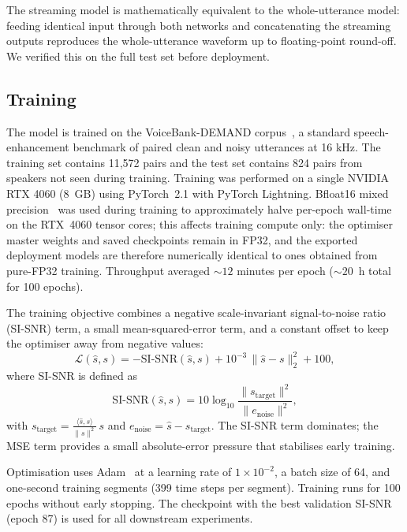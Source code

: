\documentclass[conference]{IEEEtran}
\begin{document}
The streaming model is mathematically equivalent to the whole-utterance model: feeding identical input through both networks and concatenating the streaming outputs reproduces the whole-utterance waveform up to floating-point round-off. We verified this on the full test set before deployment.


\subsection{Training}

The model is trained on the VoiceBank-DEMAND corpus~\cite{voicebank,demand}, a standard speech-enhancement benchmark of paired clean and noisy utterances at 16 kHz. The training set contains 11,572 pairs and the test set contains 824 pairs from speakers not seen during training. Training was performed on a single NVIDIA RTX 4060 (8~GB) using PyTorch~2.1 with PyTorch Lightning. Bfloat16 mixed precision~\cite{bfloat16} was used during training to approximately halve per-epoch wall-time on the RTX~4060 tensor cores; this affects training compute only: the optimiser master weights and saved checkpoints remain in FP32, and the exported deployment models are therefore numerically identical to ones obtained from pure-FP32 training. Throughput averaged ${\sim}12$ minutes per epoch (${\sim}20$~h total for 100 epochs).

The training objective combines a negative scale-invariant signal-to-noise
ratio (SI-SNR) term, a small mean-squared-error term, and a constant offset
to keep the optimiser away from negative values:
\begin{equation}
\label{eq:loss}
\mathcal{L}(\hat{s}, s) = -\mathrm{SI\text{-}SNR}(\hat{s}, s) 
  + 10^{-3}\,\lVert \hat{s} - s \rVert_2^2 + 100,
\end{equation}
where SI-SNR is defined as
\begin{equation}
\label{eq:sisnr}
\mathrm{SI\text{-}SNR}(\hat{s}, s) = 10\log_{10} 
  \frac{\lVert s_{\text{target}}\rVert^2}{\lVert e_{\text{noise}}\rVert^2},
\end{equation}
with $s_{\text{target}} = \tfrac{\langle \hat{s}, s\rangle}{\lVert s\rVert^2}\, s$ 
and $e_{\text{noise}} = \hat{s} - s_{\text{target}}$. The SI-SNR term dominates;
the MSE term provides a small absolute-error pressure that stabilises early training.



Optimisation uses Adam~\cite{adam} at a learning rate of $1 \times 10^{-2}$, a batch size of 64, and one-second training segments (399 time steps per segment). Training runs for 100 epochs without early stopping. The checkpoint with the best validation SI-SNR (epoch 87) is used for all downstream experiments.
\end{document}
